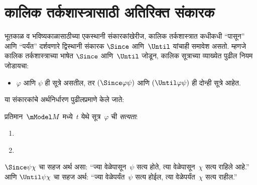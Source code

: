 \section{कालिक तर्कशास्त्रासाठी अतिरिक्त संकारक}\label{aml:tl:ext:sec}
भूतकाळ व भविष्यकाळासाठीच्या एकस्थानी संकारकांखेरीज,
कालिक तर्कशास्त्रात कधीकधी ``पासून'' आणि ``पर्यंत''
दर्शवणारे द्विस्थानी संकारक $\Since $ आणि~$\Until$
यांचाही समावेश असतो. म्हणजे कालिक तर्कशास्त्राच्या
भाषेत $\Since $ आणि~$\Until$ जोडून, कालिक
सूत्राच्या व्याख्येत पुढील नियम जोडायचा:
\begin{itemize}
\item[] $\varphi$ आणि $\psi$ ही सूत्रे असतील, तर
  $(\Since  \varphi \psi)$ आणि $(\Until \varphi \psi)$ ही दोन्ही
  सूत्रे आहेत.
\end{itemize}
या संकारकांचे अर्थनिर्धारण पुढीलप्रमाणे केले जाते:
\begin{defn}\label{aml:tl:ext:defn:since-until}
  प्रतिमान~$\mModel M$ मध्ये~$t$ येथे सूत्र~$\varphi$
  ची \emph{सत्यता}:
  \begin{enumerate}
  \item\label{aml:tl:ext:defn:sub:mmodels-since} 
   \item\label{aml:tl:ext:defn:sub:mmodels-until} 
  \end{enumerate}
\end{defn}
$\Since  \psi \chi$ चा सहज अर्थ असा: ``ज्या
वेळेपासून~$\psi$ सत्य होते, त्या वेळेपासून~$\chi$
सत्य राहिले आहे.'' आणि $\Until \psi \chi$ चा सहज
अर्थ: ``ज्या वेळेपर्यंत~$\psi$ सत्य होईल, त्या
वेळेपर्यंत~$\chi$ सत्य राहील.''
